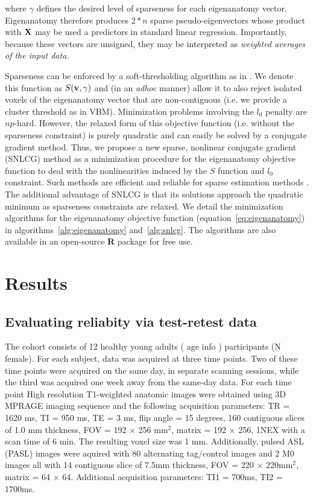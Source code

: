 \documentclass{llncs}
\newcommand{\X}{{\bf X}}
\newcommand{\vv}{{\bf v}}
\begin{document}
where $\gamma$ defines the desired level of sparseness for each eigenanatomy vector.  
Eigenanatomy therefore produces $2*n$ sparse pseudo-eigenvectors whose product with $\X$ may be used a predictors in standard linear regression.  Importantly, because these vectors are unsigned, they may be interpreted as {\em weighted averages of the input data.}  

Sparseness can be enforced by a soft-thresholding algorithm as in \cite{sparsePCA_zou,sparsePCA_witten}.  We denote this function as $S( \vv , \gamma)$ and (in an {\em adhoc} manner) allow it to also reject isolated voxels of the eigenanatomy vector that are non-contiguous (i.e. we provide a cluster threshold as in VBM).  Minimization problems involving the $l_0$ penalty are $np$-hard.  However, the relaxed form of this objective function (i.e. without the sparseness constraint) is purely quadratic and can easily be solved by a conjugate gradient method.  Thus, we propose a new sparse, nonlinear conjugate gradient (SNLCG) method as a minimization procedure for the eigenanatomy objective function to deal with the nonlinearities induced by the $S$ function and $l_0$ constraint.  Such methods are efficient and reliable for sparse estimation methods \cite{marjanovic2010}.  The additional advantage of SNLCG is that its solutions approach the quadratic minimum as sparseness constraints are relaxed.  We detail the minimization algorithms for the eigenanatomy objective function (equation~\ref{eq:eigenanatomy}) in algorithms~\ref{alg:eigenanatomy} and~\ref{alg:snlcg}.  The algorithms are also available in an open-source {\bf R} package for free use. 


\section{Results}

\subsection{Evaluating reliabity via test-retest data}
The cohort consists of 12 healthy young adults ( age info ) participants (N female). For each subject, data was acquired at three time points. Two of these time points were acquired on the same day, in separate scanning sessions, while the third was acquired one week away from the same-day data.  For each time point High resolution T1-weighted anatomic images were obtained using 3D MPRAGE imaging sequence and the following acquisition parameters: TR = 1620 ms, TI = 950 ms, TE = 3 ms, flip angle = 15 degrees, 160 contiguous slices of 1.0 mm thickness, FOV = 192 $\times$ 256 mm$^2$, matrix = 192 $\times$ 256, 1NEX with a scan time of 6 min. The resulting voxel size was 1 mm.  Additionally, pulsed ASL (PASL) images were aquired with 80 alternating tag/control images and 2 M0 images all with 14 contiguous slice of 7.5mm thickness, FOV = 220 $\times$ 220mm$^2$, matrix = 64 $\times$ 64. Additional acquisition parameters: TI1 = 700ms, TI2 = 1700ms.
\end{document}
